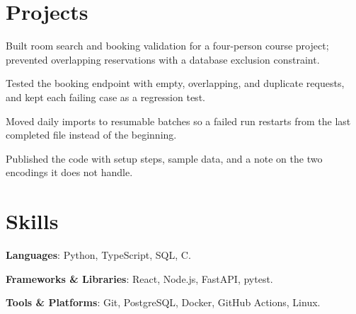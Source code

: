 \documentclass{resume}
\begin{document}
\section{Projects}

\begin{jobduties}
  \item Built room search and booking validation for a four-person course project; prevented overlapping reservations with a database exclusion constraint.
  \item Tested the booking endpoint with empty, overlapping, and duplicate requests, and kept each failing case as a regression test.
\end{jobduties}

\begin{jobduties}
  \item Moved daily imports to resumable batches so a failed run restarts from the last completed file instead of the beginning.
  \item Published the code with setup steps, sample data, and a note on the two encodings it does not handle.
\end{jobduties}

\section{Skills}
\begin{skillitems}
  \item \textbf{Languages}: Python, TypeScript, SQL, C.
  \item \textbf{Frameworks \& Libraries}: React, Node.js, FastAPI, pytest.
  \item \textbf{Tools \& Platforms}: Git, PostgreSQL, Docker, GitHub Actions, Linux.
\end{skillitems}
\end{document}
